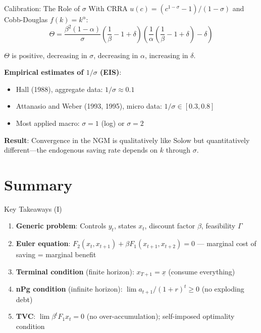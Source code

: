 \documentclass[blue]{beamer}
\begin{document}
\begin{frame}{Calibration: The Role of $\sigma$}
	With CRRA $u(c) = (c^{1-\sigma}-1)/(1-\sigma)$ and Cobb-Douglas $f(k) = k^\alpha$:
	\[
	\Theta = \frac{\beta^2(1-\alpha)}{\sigma}\left(\frac{1}{\beta} - 1 + \delta\right)\left(\frac{1}{\alpha}\left(\frac{1}{\beta} - 1 + \delta\right) - \delta\right)
	\]
	
	$\Theta$ is positive, decreasing in $\sigma$, decreasing in $\alpha$, increasing in $\delta$.

	\textbf{Empirical estimates of $1/\sigma$ (EIS)}:
	\vspace{-6pt}
	\begin{itemize}
		\item Hall (1988), aggregate data: $1/\sigma \approx 0.1$
		\item Attanasio and Weber (1993, 1995), micro data: $1/\sigma \in [0.3, 0.8]$
		\item Most applied macro: $\sigma = 1$ (log) or $\sigma = 2$
	\end{itemize}
	
	\bigskip
	\textbf{Result}: Convergence in the NGM is qualitatively like Solow but quantitatively different---the endogenous saving rate depends on $k$ through $\sigma$.
\end{frame}

\section{Summary}

\begin{frame}{Key Takeaways (I)}
	\begin{enumerate}
		\item \textbf{Generic problem}: Controls $y_t$, states $x_t$, discount factor $\beta$, feasibility $\Gamma$
		
		\item \textbf{Euler equation}: $F_2(x_t, x_{t+1}) + \beta F_1(x_{t+1}, x_{t+2}) = 0$ --- marginal cost of saving = marginal benefit
		
		\item \textbf{Terminal condition} (finite horizon): $x_{T+1} = \underline{x}$ (consume everything)
		
		\item \textbf{nPg condition} (infinite horizon): $\lim a_{t+1}/(1+r)^t \geq 0$ (no exploding debt)
		
		\item \textbf{TVC}: $\lim \beta^t F_1 x_t = 0$ (no over-accumulation); self-imposed optimality condition
	\end{enumerate}
\end{frame}
\end{document}
